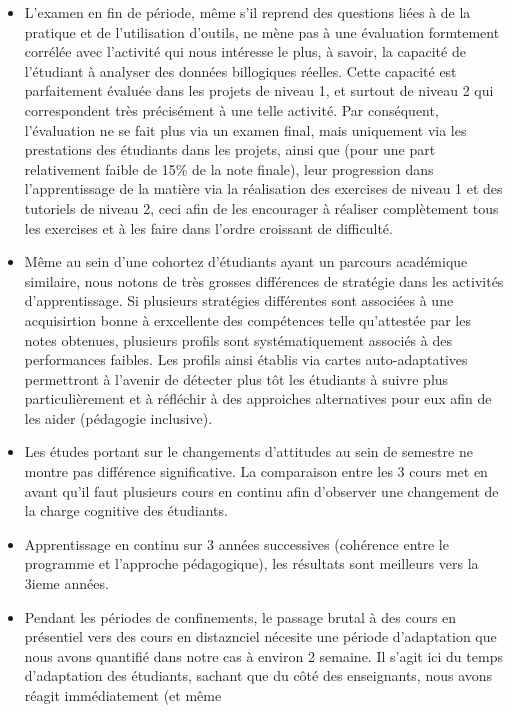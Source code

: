 \documentclass[
]{article}
\begin{document}
\begin{itemize}
\item
  L'examen en fin de période, même s'il reprend des questions liées à de
  la pratique et de l'utilisation d'outils, ne mène pas à une évaluation
  formtement corrélée avec l'activité qui nous intéresse le plus, à
  savoir, la capacité de l'étudiant à analyser des données billogiques
  réelles. Cette capacité est parfaitement évaluée dans les projets de
  niveau 1, et surtout de niveau 2 qui correspondent très précisément à
  une telle activité. Par conséquent, l'évaluation ne se fait plus via
  un examen final, mais uniquement via les prestations des étudiants
  dans les projets, ainsi que (pour une part relativement faible de 15\%
  de la note finale), leur progression dans l'apprentissage de la
  matière via la réalisation des exercises de niveau 1 et des tutoriels
  de niveau 2, ceci afin de les encourager à réaliser complètement tous
  les exercises et à les faire dans l'ordre croissant de difficulté.
\item
  Même au sein d'une cohortez d'étudiants ayant un parcours académique
  similaire, nous notons de très grosses différences de stratégie dans
  les activités d'apprentissage. Si plusieurs stratégies différentes
  sont associées à une acquisirtion bonne à erxcellente des compétences
  telle qu'attestée par les notes obtenues, plusieurs profils sont
  systématiquement associés à des performances faibles. Les profils
  ainsi établis via cartes auto-adaptatives permettront à l'avenir de
  détecter plus tôt les étudiants à suivre plus particulièrement et à
  réfléchir à des approiches alternatives pour eux afin de les aider
  (pédagogie inclusive).
\item
  Les études portant sur le changements d'attitudes au sein de semestre
  ne montre pas différence significative. La comparaison entre les 3
  cours met en avant qu'il faut plusieurs cours en continu afin
  d'observer une changement de la charge cognitive des étudiants.
\item
  Apprentissage en continu sur 3 années successives (cohérence entre le
  programme et l'approche pédagogique), les résultats sont meilleurs
  vers la 3ieme années.
\item
  Pendant les périodes de confinements, le passage brutal à des cours en
  présentiel vers des cours en distaznciel nécesite une période
  d'adaptation que nous avons quantifié dans notre cas à environ 2
  semaine. Il s'agit ici du temps d'adaptation des étudiants, sachant
  que du côté des enseignants, nous avons réagit immédiatement (et même

\end{itemize}
\end{document}
